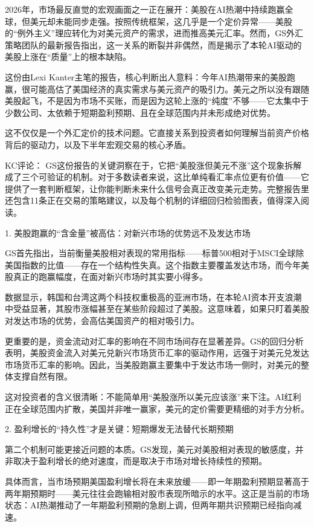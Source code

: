 \documentclass[11pt]{ctexart}
\begin{document}
2026年，市场最反直觉的宏观画面之一正在展开：美股在AI热潮中持续跑赢全球，但美元却未能同步走强。按照传统框架，这几乎是一个定价异常——美股的“例外主义”理应转化为对美元资产的需求，进而推高美元汇率。然而，GS外汇策略团队的最新报告指出，这一关系的断裂并非偶然，而是揭示了本轮AI驱动的美股上涨在“质量”上的根本缺陷。

这份由Lexi Kanter主笔的报告，核心判断出人意料：今年AI热潮带来的美股跑赢，很可能高估了美国经济的真实需求与美元资产的吸引力。美元之所以没有跟随美股起飞，不是因为市场不买账，而是因为这轮上涨的“纯度”不够——它太集中于少数公司、太依赖于短期盈利预期、且在全球范围内并未形成绝对优势。

这不仅仅是一个外汇定价的技术问题。它直接关系到投资者如何理解当前资产价格背后的驱动力，以及下半年宏观交易的核心矛盾。

KC评论： GS这份报告的关键洞察在于，它把“美股涨但美元不涨”这个现象拆解成了三个可验证的机制。对于多数读者来说，这比单纯看汇率点位更有价值——它提供了一套判断框架，让你能判断未来什么信号会真正改变美元走势。完整报告里还包含11条正在交易的策略建议，以及每个机制的详细回归检验图表，值得深入阅读。

1. 美股跑赢的“含金量”被高估：对新兴市场的优势远不及发达市场

GS首先指出，当前衡量美股相对表现的常用指标——标普500相对于MSCI全球除美国指数的比值——存在一个结构性失真。这个指数主要覆盖发达市场，而今年美股真正的跑赢幅度，在面对新兴市场时其实要小得多。

数据显示，韩国和台湾这两个科技权重极高的亚洲市场，在本轮AI资本开支浪潮中受益显著，其股市涨幅甚至在某些阶段超过了美股。这意味着，如果只盯着美股对发达市场的优势，会高估美国资产的相对吸引力。

更重要的是，资金流动对汇率的影响在不同市场间存在显著差异。GS的回归分析表明，美股资金流入对美元兑新兴市场货币汇率的驱动作用，远强于对美元兑发达市场货币汇率的影响。因此，当美股跑赢主要集中于发达市场一侧时，对美元的整体支撑自然有限。

这对投资者的含义很清晰：不能简单用“美股涨所以美元应该涨”来下注。AI红利正在全球范围内扩散，美国并非唯一赢家，美元的定价需要更精细的对手方分析。

2. 盈利增长的“持久性”才是关键：短期爆发无法替代长期预期

第二个机制可能更接近问题的本质。GS发现，美元对美股相对表现的敏感度，并非取决于盈利增长的绝对速度，而是取决于市场对增长持续性的预期。

具体而言，当市场预期美国盈利增长将在未来放缓——即一年期盈利预期显著高于两年期预期时——美元往往会跑输相对股市表现所暗示的水平。这正是当前的市场状态：AI热潮推动了一年期盈利预期的急剧上调，但两年期共识预期已经指向减速。
\end{document}
